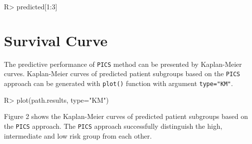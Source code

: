 \documentclass[11pt]{article}
\begin{document}
\begin{Schunk}
\begin{Sinput}
R> predicted[1:3]
\end{Sinput}
\end{Schunk}

\section{Survival Curve}
The predictive performance of \texttt{PICS} method can be presented by Kaplan-Meier curves.
Kaplan-Meier curves of predicted patient subgroups based on the \texttt{PICS} approach can be generated with \texttt{plot()} function with argument \texttt{type="{}KM"{}}.

\begin{Schunk}
\begin{Sinput}
R> plot(path.results, type="KM")
\end{Sinput}
\end{Schunk}

Figure 2 shows the Kaplan-Meier curves of predicted patient subgroups based on the \texttt{PICS} approach. The \texttt{PICS} approach successfully distinguish the high, intermediate and low risk group from each other.
\end{document}
